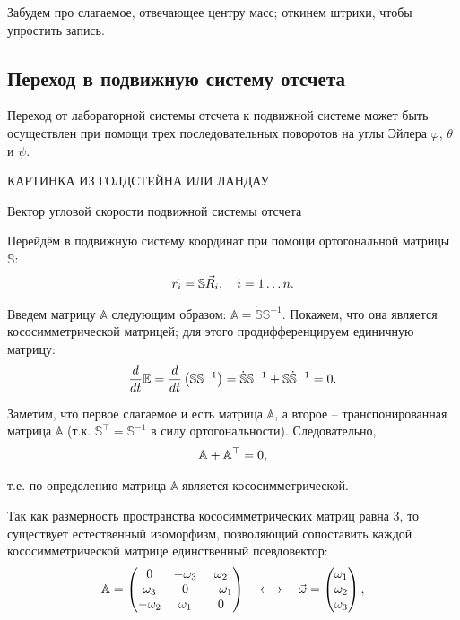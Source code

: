 \documentclass[12pt]{article}
\begin{document}
Забудем про слагаемое, отвечающее центру масс; откинем штрихи, чтобы упростить запись.

\subsection{Переход в подвижную систему отсчета}

Переход от лабораторной системы отсчета к подвижной системе может быть осуществлен при помощи трех последовательных поворотов на углы Эйлера $\varphi$, $\theta$ и $\psi$. 

КАРТИНКА ИЗ ГОЛДСТЕЙНА ИЛИ ЛАНДАУ

Вектор угловой скорости подвижной системы отсчета 

Перейдём в подвижную систему координат при помощи ортогональной матрицы $\mathbb{S}$:
\vspace*{-0.1cm}
\begin{gather}
\vec{r}_i = \mathbb{S} \vec{R}_i, \quad i = 1 \dots n. \notag
\end{gather}

Введем матрицу $\mathbb{A}$ следующим образом: $\mathbb{A} = \dot{\mathbb{S}} \mathbb{S}^{-1}$. Покажем, что она является кососимметрической матрицей; для этого продифференцируем единичную матрицу:
\vspace*{-0.1cm}
\begin{gather}
\frac{d}{dt} \mathbb{E} = \frac{d}{dt} \left( \mathbb{S} \mathbb{S}^{-1}\right) = \dot{\mathbb{S}} \mathbb{S}^{-1} + \mathbb{S} \dot{\mathbb{S}}^{-1} = 0. \notag
\end{gather}

Заметим, что первое слагаемое и есть матрица $\mathbb{A}$, а второе -- транспонированная матрица $\mathbb{A}$ (т.к. $\mathbb{S}^\top = \mathbb{S}^{-1}$ в силу ортогональности). Следовательно,
\vspace*{-0.1cm}
\begin{gather}
\mathbb{A} + \mathbb{A}^\top = 0, \notag
\end{gather}

\hspace*{-0.75cm} т.е. по определению матрица $\mathbb{A}$ является кососимметрической.

Так как размерность пространства кососимметрических матриц равна 3, то существует естественный изоморфизм, позволяющий сопоставить каждой кососимметрической матрице единственный псевдовектор:
\vspace*{-0.1cm}
\begin{gather}
\mathbb{A} = 
\begin{pmatrix}
0 & -\omega_3 & \omega_2 \\
\omega_3 & 0 & -\omega_1 \\
-\omega_2 & \omega_1 & 0
\end{pmatrix}
\quad
\longleftrightarrow
\quad
\vec{\omega} = 
\begin{pmatrix}
\omega_1 \\
\omega_2 \\
\omega_3
\end{pmatrix}
,
\notag
\end{gather}
\end{document}
